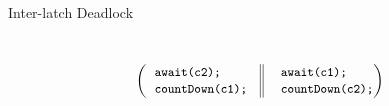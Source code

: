 \begin{frame}{Inter-latch Deadlock}
  \begin{small}
\begin{center}
\\
\[
{
\left(
\begin{tabular}{ l@{\extracolsep{\fill}}  || l@{\extracolsep{\fill}} }
\code{await(c2);~~} &~~\code{await(c1);}\\
\code{countDown(c1);~~} &~~\code{countDown(c2);}\\
\end{tabular}\right)%
}
\]


\end{center}
\end{small}
\pause
   \\
   \\
  \\
   \\

\end{frame}

